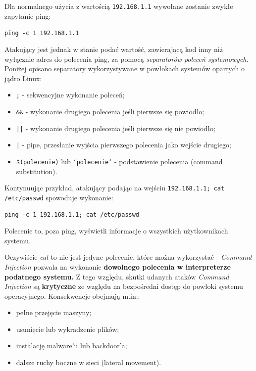 \documentclass[12pt,a4paper]{article}
\begin{document}
Dla normalnego użycia z wartością \texttt{192.168.1.1} wywołane zostanie zwykłe zapytanie ping:

\begin{tcolorbox}
\texttt{ping -c 1 192.168.1.1}
\end{tcolorbox}

Atakujący jest jednak w stanie podać wartość, zawierającą kod inny niż wyłącznie adres do polecenia ping, za pomocą \emph{separatorów poleceń systemowych}. 
Poniżej opisano separatory wykorzystywane w powłokach systemów opartych o jądro Linux:
\begin{itemize}
    \item \texttt{;} - sekwencyjne wykonanie poleceń;
    \item \texttt{\&\&} - wykonanie drugiego polecenia jeśli pierwsze się powiodło;
    \item \texttt{||} - wykonanie drugiego polecenia jeśli pierwsze się nie powiodło;
    \item \texttt{|} - pipe, przesłanie wyjścia pierwszego polecenia jako wejście drugiego;
    \item \texttt{\$(polecenie)} lub \texttt{`polecenie`} - podstawienie polecenia (command substitution).
\end{itemize}

Kontynuując przykład, atakujący podając na wejściu \texttt{192.168.1.1; cat /etc/passwd} spowoduje wykonanie:

\begin{tcolorbox}
\texttt{ping -c 1 192.168.1.1; cat /etc/passwd}
\end{tcolorbox}

Polecenie to, poza ping, wyświetli informacje o wszystkich użytkownikach systemu.

Oczywiście \emph{cat} to nie jest jedyne polecenie, które można wykorzystać - \emph{Command Injection} pozwala na wykonanie \textbf{dowolnego polecenia w interpreterze podatnego systemu.}
Z tego względu, skutki udanych ataków \emph{Command Injection} są \textbf{krytyczne} ze względu na bezpośredni dostęp do powłoki systemu operacyjnego. Konsekwencje obejmują m.in.:
\begin{itemize}
    \item pełne przejęcie maszyny;
    \item usunięcie lub wykradzenie plików;
    \item instalację malware'u lub backdoor'a;
    \item dalsze ruchy boczne w sieci (lateral movement).
\end{itemize}
\end{document}

